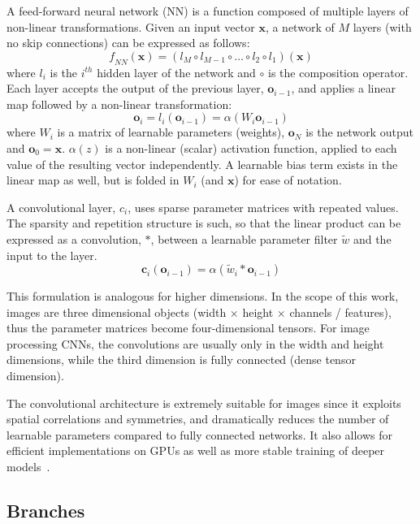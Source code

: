 \documentclass{egpubl}
\newcommand\mb[1]{\mathbf{#1}}
\newcommand\mi[1]{\mathit{#1}}
\begin{document}
A feed-forward neural network (NN) is a function composed of multiple layers of
non-linear transformations. Given an input vector $\mb{x}$, a network of $M$
layers (with no skip connections) can be expressed as follows:
\begin{equation}
    \mi{f}_{NN}(\mb{x}) = (l_M \circ l_{M-1} \circ \dots \circ l_2 \circ l_1)(\mb{x})
\end{equation}
where $l_i$ is the $i^{th}$ hidden layer of the network and $\circ$ is the
composition operator. Each layer accepts the output of the previous layer,
$\mb{o}_{i-1}$, and applies a linear map followed by a non-linear
transformation:
\begin{equation}
    \mb{o}_i = l_i(\mb{o}_{i-1}) = \alpha (W_i \mb{o}_{i-1})
\end{equation}
where $W_i$ is a matrix of learnable parameters (weights), $\mb{o}_N$ is the
network output and $\mb{o}_0 = \mb{x}$. $\alpha(z)$ is a non-linear (scalar)
activation function, applied to each value of the resulting vector
independently. A learnable bias term exists in the linear map as well, but is
folded in $W_i$ (and $\mb{x}$) for ease of notation.

A convolutional layer, $c_i$, uses sparse parameter matrices with repeated
values. The sparsity and repetition structure is such, so that the linear
product can be expressed as a convolution, $\ast$, between a learnable parameter filter
$\tilde{w}$ and the input to the layer.
\begin{equation}
    \mb{c}_i (\mb{o}_{i-1}) = \alpha (\tilde{w}_{i} \ast \mb{o}_{i-1})
\end{equation}

This formulation is analogous for higher dimensions. In the scope of this work,
images are three dimensional objects
(width $\times$ height $\times$ channels / features), thus the parameter matrices
become four-dimensional tensors. For image processing CNNs, the convolutions
are usually only in the width and height dimensions, while the third dimension
is fully connected (dense tensor dimension).

The convolutional architecture is extremely suitable for images since it exploits spatial correlations and symmetries, and dramatically reduces the
number of learnable parameters compared to fully connected networks. It also allows for efficient implementations on GPUs as well as more stable
training of deeper models~\cite{schmidhuber2014deep}.

\subsection{\textbf{Branches}}
\end{document}

